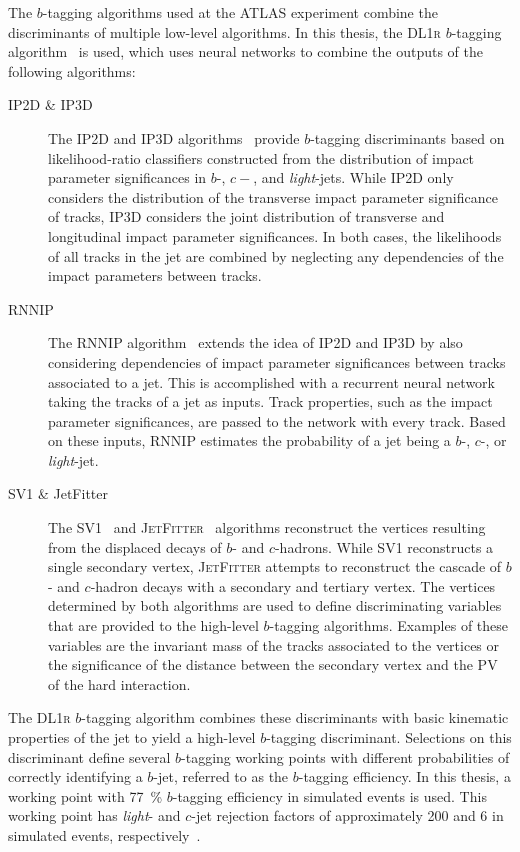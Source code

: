 The $b$-tagging algorithms used at the ATLAS experiment combine the
discriminants of multiple low-level algorithms. In this thesis, the
\textsc{DL1r} $b$-tagging algorithm~\cite{FTAG-2019-07} is used, which uses
neural networks to combine the outputs of the following algorithms:
\begin{description}

\item[IP2D \& IP3D] The \textsc{IP2D} and \textsc{IP3D}
  algorithms~\cite{ATL-PHYS-PUB-2017-013} provide $b$-tagging discriminants
  based on likelihood-ratio classifiers constructed from the distribution of
  impact parameter significances in $b$-, $c-$, and \emph{light}-jets. While
  \textsc{IP2D} only considers the distribution of the transverse impact
  parameter significance of tracks, \textsc{IP3D} considers the joint
  distribution of transverse and longitudinal impact parameter significances.
  In both cases, the likelihoods of all tracks in the jet are combined by
  neglecting any dependencies of the impact parameters between tracks.

\item[RNNIP] The \textsc{RNNIP} algorithm~\cite{ATL-PHYS-PUB-2017-003} extends
  the idea of \textsc{IP2D} and \textsc{IP3D} by also considering dependencies
  of impact parameter significances between tracks associated to a jet. This is
  accomplished with a recurrent neural network taking the tracks of a jet as
  inputs. Track properties, such as the impact parameter significances, are
  passed to the network with every track. Based on these inputs, \textsc{RNNIP}
  estimates the probability of a jet being a $b$-, $c$-, or \emph{light}-jet.

\item[SV1 \& JetFitter] The \textsc{SV1}~\cite{ATL-PHYS-PUB-2017-011} and
  \textsc{JetFitter}~\cite{ATL-PHYS-PUB-2018-025} algorithms reconstruct the
  vertices resulting from the displaced decays of $b$- and $c$-hadrons. While
  \textsc{SV1} reconstructs a single secondary vertex, \textsc{JetFitter}
  attempts to reconstruct the cascade of $b$- and $c$-hadron decays with a
  secondary and tertiary vertex. The vertices determined by both algorithms are
  used to define discriminating variables that are provided to the high-level
  $b$-tagging algorithms. Examples of these variables are the invariant mass of
  the tracks associated to the vertices or the significance of the distance
  between the secondary vertex and the PV of the hard interaction.

\end{description}
The \textsc{DL1r} $b$-tagging algorithm combines these discriminants with basic
kinematic properties of the jet to yield a high-level $b$-tagging discriminant.
Selections on this discriminant define several $b$-tagging working points with
different probabilities of correctly identifying a $b$-jet, referred to as the
$b$-tagging efficiency. In this thesis, a working point with \SI{77}{\percent}
$b$-tagging efficiency in simulated \ttbar events is used.  This working point
has \emph{light}- and $c$-jet rejection factors of approximately 200 and 6 in
simulated \ttbar events, respectively~\cite{FTAG-2019-07}.


